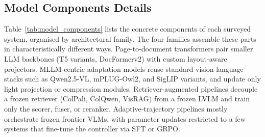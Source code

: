 \documentclass[11pt]{article}
\begin{document}
\subsection{Model Components Details}
\label{app:components}
Table~\ref{tab:model_components} lists the concrete components of each surveyed system, organised by architectural family. The four families assemble these parts in characteristically different ways. Page-to-document transformers pair smaller LLM backbones (T5 variants, DocFormerv2) with custom layout-aware projectors. MLLM-centric adaptation models reuse standard vision-language stacks such as Qwen2.5-VL, mPLUG-Owl2, and SigLIP variants, and update only light projection or compression modules. Retriever-augmented pipelines decouple a frozen retriever (ColPali, ColQwen, VisRAG) from a frozen LVLM and train only the scorer, fuser, or reranker. Adaptive-trajectory pipelines mostly orchestrate frozen frontier VLMs, with parameter updates restricted to a few systems that fine-tune the controller via SFT or GRPO.








\end{document}
